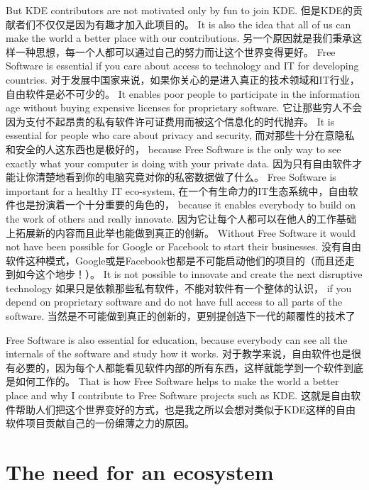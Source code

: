 But KDE contributors are not motivated only by fun to join KDE.
但是KDE的贡献者们不仅仅是因为有趣才加入此项目的。
It is also the idea that all of us can make the world a better place with our contributions.
另一个原因就是我们秉承这样一种思想，每一个人都可以通过自己的努力而让这个世界变得更好。
Free Software is essential if you care about access to technology and IT for developing countries.
对于发展中国家来说，如果你关心的是进入真正的技术领域和IT行业，自由软件是必不可少的。
It enables poor people to participate in the information age without buying expensive licenses for proprietary software.
它让那些穷人不会因为支付不起昂贵的私有软件许可证费用而被这个信息化的时代抛弃。
It is essential for people who care about privacy and security, 
而对那些十分在意隐私和安全的人这东西也是极好的，
because Free Software is the only way to see exactly what your computer is doing with your private data.
因为只有自由软件才能让你清楚地看到你的电脑究竟对你的私密数据做了什么。
Free Software is important for a healthy IT eco-system,
在一个有生命力的IT生态系统中，自由软件也是扮演着一个十分重要的角色的，
because it enables everybody to build on the work of others and really innovate.
因为它让每个人都可以在他人的工作基础上拓展新的内容而且此举也能做到真正的创新。
Without Free Software it would not have been possible for Google or Facebook to start their businesses.
没有自由软件这种模式，Google或是Facebook也都是不可能启动他们的项目的（而且还走到如今这个地步！）。
It is not possible to innovate and create the next disruptive technology
如果只是依赖那些私有软件，不能对软件有一个整体的认识，
if you depend on proprietary software and do not have full access to all parts of the software.
当然是不可能做到真正的创新的，更别提创造下一代的颠覆性的技术了

Free Software is also essential for education, because everybody can see all the internals of the software and study how it works. 
对于教学来说，自由软件也是很有必要的，因为每个人都能看见软件内部的所有东西，这样就能学到一个软件到底是如何工作的。
That is how Free Software helps to make the world a better place and why I contribute to Free Software projects such as KDE.
这就是自由软件帮助人们把这个世界变好的方式，也是我之所以会想对类似于KDE这样的自由软件项目贡献自己的一份绵薄之力的原因。

\section*{The need for an ecosystem}

